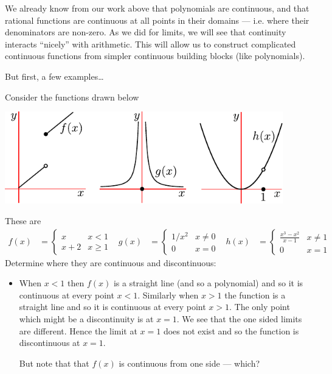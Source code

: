 We already know from our work above that polynomials are continuous, and that
rational functions are continuous at all points in their domains --- i.e. where
their denominators are non-zero. As we did for
limits, we will see that continuity interacts ``nicely'' with arithmetic. This
will allow us to construct complicated continuous functions from simpler
continuous building blocks (like polynomials).

But first, a few examples\dots
\begin{eg}
Consider the functions drawn below
\begin{efig}
\begin{center}
 \includegraphics[height=4cm]{lim6}\\
\end{center}
\end{efig}
These are
\begin{align*}
f(x) &= \begin{cases} x&x<1 \\ x+2 & x\geq 1 \end{cases}
&
g(x) &= \begin{cases} 1/x^2& x\neq0 \\ 0 & x=0\end{cases}
&
h(x) &= \begin{cases}\frac{x^3-x^2}{x-1} & x\neq 1\\ 0 & x=1 \end{cases}
\end{align*}
Determine where they are continuous and discontinuous:
\begin{itemize}
\item When $x<1$ then $f(x)$ is a straight line (and so a polynomial) and so it is
continuous at every point $x<1$. Similarly when $x>1$ the function is a
straight line and so it is continuous at every point $x>1$. The only point which
might be a discontinuity is at $x=1$. We see that the one sided limits are
different. Hence the limit at $x=1$ does not exist and so the function is
discontinuous at $x=1$.

But note that that $f(x)$ is continuous from one side --- which?


\end{itemize}
\end{eg}
